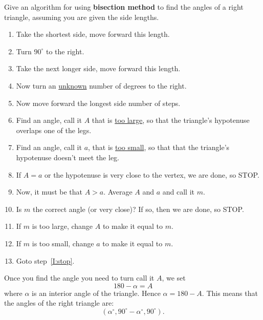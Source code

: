 \documentclass[noauthor,nooutcomes,handout]{ximera}
\begin{document}
\begin{question}
  Give an algorithm for using \textbf{bisection method} to find the angles of a
  right triangle, assuming you are given the side lengths.
  \begin{freeResponse}
    \begin{enumerate}
    \item Take the shortest side, move forward this length.
    \item Turn $90^\circ$ to the right.
    \item Take the next longer side, move forward this length.
    \item Now turn an \underline{unknown} number of degrees to the right.
    \item Now move forward the longest side number of steps.
    \item Find an angle, call it $A$ that is \underline{too large}, so
      that the triangle's hypotenuse overlaps one of the legs.
    \item Find an angle, call it $a$, that is \underline{too small},
      so that that the triangle's hypotenuse doesn't meet the leg.
    \item\label{I:stop} If $A=a$ or the hypotenuse is very close to
      the vertex, we are done, so STOP.
    \item Now, it must be that $A>a$. Average $A$ and $a$ and call it $m$.
    \item Is $m$ the correct angle (or very close)? If so, then we are done, so STOP.
    \item If $m$ is too large, change $A$ to make it equal to $m$.
    \item If $m$ is too small, change $a$ to make it equal to $m$.
    \item Goto step~\ref{I:stop}.
    \end{enumerate}
    Once you find the angle you need to turn call it $A$, we set
    \[
    180-\alpha = A
    \]
    where $\alpha$ is an interior angle of the triangle.  Hence
    $\alpha = 180-A$. This means that the angles of the right triangle
    are:
    \[
    (\alpha^\circ,90^\circ-\alpha^\circ,90^\circ).
    \]
  \end{freeResponse}
\end{question}
\end{document}
